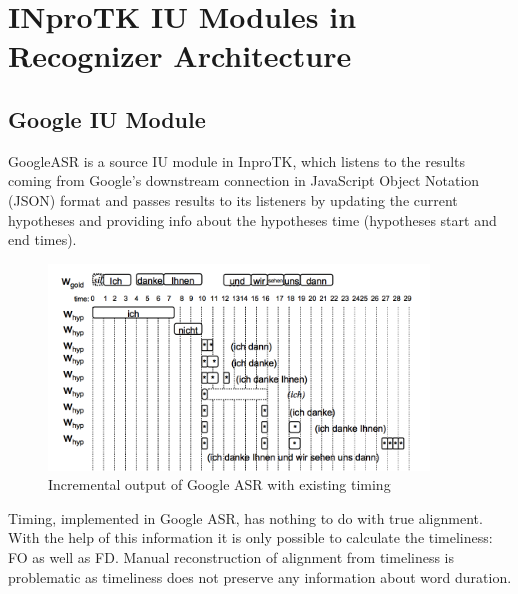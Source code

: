 \section {INproTK IU Modules in Recognizer Architecture}
\subsection  {Google IU Module}
GoogleASR is a source IU module in InproTK, which listens to the
results coming from Google's  downstream connection in JavaScript Object Notation (JSON) format and
passes results to its listeners by updating the current hypotheses and providing
info about the hypotheses time (hypotheses start and end times).
 \begin{figure}[htbp]
  \centering
   \includegraphics[width=0.9\textwidth]{images/google_output.png}
  \caption{Incremental output of Google ASR with existing timing}
  \label{fig:google_ouput}
\end{figure}

Timing, implemented in Google ASR, has nothing to do with true alignment.
With the help of this information  it is only possible to calculate the
timeliness: FO as well as FD.  Manual reconstruction of alignment from
timeliness is problematic as timeliness does not preserve any information about word
duration. 

